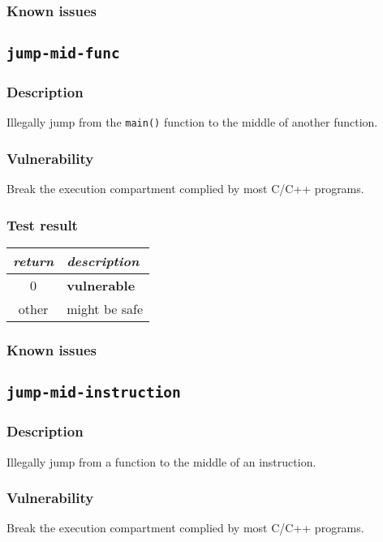 \documentclass[a4paper]{book}
\begin{document}
\subsubsection{Known issues}

\newpage
\subsection{\texttt{jump-mid-func}}\label{test-jump-mid-func}

\subsubsection{Description}
Illegally jump from the \texttt{main()} function to the middle of another function.

\subsubsection{Vulnerability}
Break the execution compartment complied by most C/C++ programs.

\subsubsection{Test result}
\begin{tabular}{cl}
  \toprule
  \emph{return}  & \emph{description} \\
  \midrule
  0              & \textbf{vulnerable} \\
  other          & might be safe \\
  \bottomrule
\end{tabular}
  
\subsubsection{Known issues}



\newpage
\subsection{\texttt{jump-mid-instruction}}\label{test-jump-mid-instruction}

\subsubsection{Description}
Illegally jump from a function to the middle of an instruction.

\subsubsection{Vulnerability}
Break the execution compartment complied by most C/C++ programs.
\end{document}
